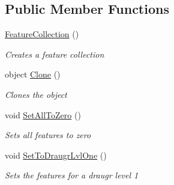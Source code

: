 \subsection*{Public Member Functions}
\begin{DoxyCompactItemize}
\item 
\hyperlink{class_hel_project_1_1_features_1_1_feature_collection_a8494a00531f9807cb6e5c57137a12ee8}{Feature\+Collection} ()
\begin{DoxyCompactList}\small\item\em Creates a feature collection \end{DoxyCompactList}\item 
object \hyperlink{class_hel_project_1_1_features_1_1_feature_collection_a920d45565d353cc73c05055018d498eb}{Clone} ()
\begin{DoxyCompactList}\small\item\em Clones the object \end{DoxyCompactList}\item 
void \hyperlink{class_hel_project_1_1_features_1_1_feature_collection_a82f6190e8a0b0772e31e75bb7c514145}{Set\+All\+To\+Zero} ()
\begin{DoxyCompactList}\small\item\em Sets all features to zero \end{DoxyCompactList}\item 
void \hyperlink{class_hel_project_1_1_features_1_1_feature_collection_a35258cc7e0f431ccdd72fbb8a38005e4}{Set\+To\+Draugr\+Lvl\+One} ()
\begin{DoxyCompactList}\small\item\em Sets the features for a draugr level 1 \end{DoxyCompactList}\end{DoxyCompactItemize}
